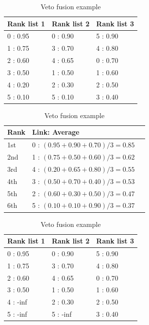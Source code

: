 \begin{table}
  \centering
  \caption{Veto fusion example}
  \label{tab:veto_example}

  \begin{tabular}{l l l}
    \toprule
    Rank list 1 & Rank list 2 & Rank list 3 \\
    \midrule
    0 : 0.95    & 0 : 0.90    & 5 : 0.90 \\
    1 : 0.75    & 3 : 0.70    & 4 : 0.80 \\
    2 : 0.60    & 4 : 0.65    & 0 : 0.70 \\
    3 : 0.50    & 1 : 0.50    & 1 : 0.60 \\
    4 : 0.20    & 2 : 0.30    & 2 : 0.50 \\
    5 : 0.10    & 5 : 0.10    & 3 : 0.40 \\
    \bottomrule
  \end{tabular}

  \begin{tabular}{l l l}
    \toprule
    Rank & Link: Average \\
    \midrule
    1st & 0 : $(0.95 + 0.90 + 0.70)/3 = 0.85$ \\
    2nd & 1 : $(0.75 + 0.50 + 0.60)/3 = 0.62$ \\
    3rd & 4 : $(0.20 + 0.65 + 0.80)/3 = 0.55$ \\
    4th & 3 : $(0.50 + 0.70 + 0.40)/3 = 0.53$ \\
    5th & 2 : $(0.60 + 0.30 + 0.50)/3 = 0.47$ \\
    6th & 5 : $(0.10 + 0.10 + 0.90)/3 = 0.37$ \\
    \bottomrule
  \end{tabular}

  \begin{tabular}{l l l}
    \toprule
    Rank list 1 & Rank list 2 & Rank list 3 \\
    \midrule
    0 : 0.95    & 0 : 0.90    & 5 : 0.90 \\
    1 : 0.75    & 3 : 0.70    & 4 : 0.80 \\
    2 : 0.60    & 4 : 0.65    & 0 : 0.70 \\
    3 : 0.50    & 1 : 0.50    & 1 : 0.60 \\
    4 : -inf    & 2 : 0.30    & 2 : 0.50 \\
    5 : -inf    & 5 : -inf    & 3 : 0.40 \\
    \bottomrule
  \end{tabular}


\end{table}

